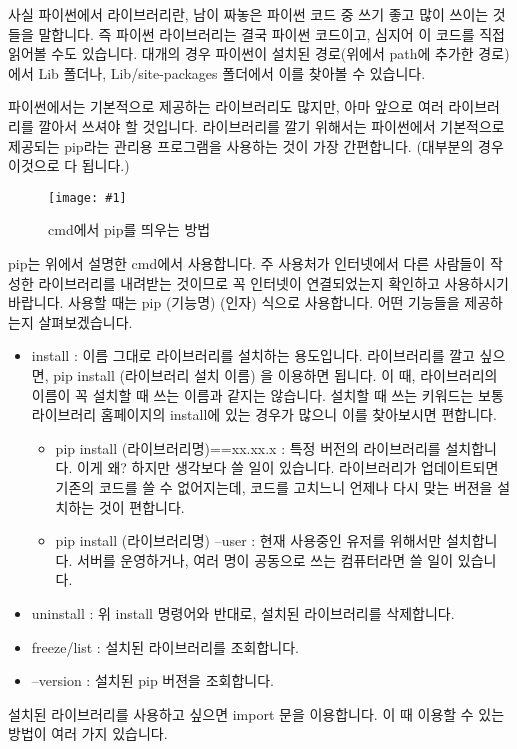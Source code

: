 \documentclass[twoside]{article}
\newcommand\fig[2]{
\begin{figure}[h]
  \centering
  \texttt{[image: \#1]}
  \caption{#2} 
  \label{fig:#1}
\end{figure}
}
\begin{document}
사실 파이썬에서 라이브러리란, 남이 짜놓은 파이썬 코드 중 쓰기 좋고 많이 쓰이는 것들을 말합니다. 즉 파이썬 라이브러리는 결국 파이썬 코드이고, 심지어 이 코드를 직접 읽어볼 수도 있습니다. 대개의 경우 파이썬이 설치된 경로(위에서 path에 추가한 경로)에서 Lib 폴더나, Lib/site-packages 폴더에서 이를 찾아볼 수 있습니다. 

파이썬에서는 기본적으로 제공하는 라이브러리도 많지만, 아마 앞으로 여러 라이브러리를 깔아서 쓰셔야 할 것입니다. 라이브러리를 깔기 위해서는 파이썬에서 기본적으로 제공되는 pip라는 관리용 프로그램을 사용하는 것이 가장 간편합니다. (대부분의 경우 이것으로 다 됩니다.) 

\fig{pip}{cmd에서 pip를 띄우는 방법} 

pip는 위에서 설명한 cmd에서 사용합니다. 주 사용처가 인터넷에서 다른 사람들이 작성한 라이브러리를 내려받는 것이므로 꼭 인터넷이 연결되었는지 확인하고 사용하시기 바랍니다. 사용할 때는 pip (기능명) (인자) 식으로 사용합니다. 어떤 기능들을 제공하는지 살펴보겠습니다. 

\begin{itemize}
\item install : 이름 그대로 라이브러리를 설치하는 용도입니다. 라이브러리를 깔고 싶으면, pip install (라이브러리 설치 이름) 을 이용하면 됩니다. 이 때, 라이브러리의 이름이 꼭 설치할 때 쓰는 이름과 같지는 않습니다. 설치할 때 쓰는 키워드는 보통 라이브러리 홈페이지의 install에 있는 경우가 많으니 이를 찾아보시면 편합니다. 
\begin{itemize}
\item pip install (라이브러리명)==xx.xx.x : 특정 버전의 라이브러리를 설치합니다. 이게 왜? 하지만 생각보다 쓸 일이 있습니다. 라이브러리가 업데이트되면 기존의 코드를 쓸 수 없어지는데, 코드를 고치느니 언제나 다시 맞는 버젼을 설치하는 것이 편합니다. 
\item pip install (라이브러리명) --user : 현재 사용중인 유저를 위해서만 설치합니다. 서버를 운영하거나, 여러 명이 공동으로 쓰는 컴퓨터라면 쓸 일이 있습니다. 
\end{itemize}
\item uninstall : 위 install 명령어와 반대로, 설치된 라이브러리를 삭제합니다. 
\item freeze/list : 설치된 라이브러리를 조회합니다. 
\item --version : 설치된 pip 버젼을 조회합니다.  
\end{itemize}

설치된 라이브러리를 사용하고 싶으면 import 문을 이용합니다. 이 때 이용할 수 있는 방법이 여러 가지 있습니다. 
\end{document}
